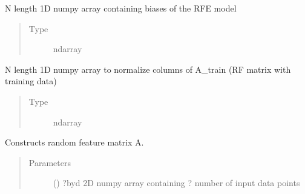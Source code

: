 \documentclass[letterpaper,10pt,english]{sphinxmanual}
\begin{document}
\begin{fulllineitems}
\begin{fulllineitems}
\label{\detokenize{rom:rom.response_surfaces.RFE.bias}}
\sphinxAtStartPar
N length 1D numpy array containing biases of the RFE model
\begin{quote}\begin{description}
\item[{Type}] \leavevmode
\sphinxAtStartPar
ndarray

\end{description}\end{quote}

\end{fulllineitems}


\begin{fulllineitems}
\label{\detokenize{rom:rom.response_surfaces.RFE.scale_A_normalize}}
\sphinxAtStartPar
N length 1D numpy array to normalize columns of A\_train (RF matrix with training data)
\begin{quote}\begin{description}
\item[{Type}] \leavevmode
\sphinxAtStartPar
ndarray

\end{description}\end{quote}

\end{fulllineitems}


\begin{fulllineitems}
\label{\detokenize{rom:rom.response_surfaces.RFE.construct_A}}
\sphinxAtStartPar
Constructs random feature matrix A.
\begin{quote}\begin{description}
\item[{Parameters}] \leavevmode
\sphinxAtStartPar
{} () \textendash{} ?\sphinxhyphen{}by\sphinxhyphen{}d 2D numpy array containing ? number of input data points


\end{description}
\end{quote}
\end{fulllineitems}
\end{fulllineitems}
\end{document}
